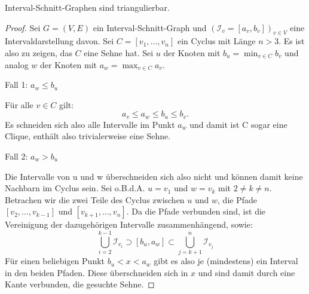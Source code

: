 \documentclass[../main.tex]{subfiles}
\begin{document}

\begin{satz}
    Interval-Schnitt-Graphen sind triangulierbar.
\end{satz}
\begin{proof}
    Sei $G = (V, E)$ ein Interval-Schnitt-Graph und $(\mathcal I_v = [a_v, b_v])_{v\in V}$ eine Intervaldarstellung davon. Sei $C = [v_1, \hdots, v_n]$ ein Cyclus mit Länge $n>3$. Es ist also zu zeigen, das $C$ eine Sehne hat. Sei $u$ der Knoten mit $b_u = \min_{v\in C} b_v$ und analog $w$ der Knoten mit $a_w = \max_{v\in C} a_v$.
    
    Fall 1: $a_w \leq b_u$
    
    Für alle $v\in C$ gilt: $$a_v\leq a_w \leq b_u \leq b_v.$$
    Es schneiden sich also alle Intervalle im Punkt $a_w$ und damit ist C sogar eine Clique, enthält also trivialerweise eine Sehne.
    
    Fall 2: $a_w > b_u$
    
    Die Intervalle von u und w überschneiden sich also nicht und können damit keine Nachbarn im Cyclus sein. Sei o.B.d.A. $u = v_1$ und $w=v_k$ mit $2 \neq k \neq n$. Betrachen wir die zwei Teile des Cyclus zwischen $u$ und $w$, die Pfade $[v_2, \hdots, v_{k-1}]$ und $[v_{k+1}, \hdots, v_n]$. Da die Pfade verbunden sind, ist die Vereinigung der dazugehörigen Intervalle zusammenhängend, sowie:
    \begin{equation*}
        \bigcup\limits_{i = 2}^{k-1} \mathcal I_{v_i} \supset [b_u, a_w] \subset \bigcup\limits_{j = k+1}^{n} \mathcal I_{v_j}
    \end{equation*}
    Für einen beliebigen Punkt $b_u < x < a_w$ gibt es also je (mindestens) ein Interval in den beiden Pfaden. Diese überschneiden sich in $x$ und sind damit durch eine Kante verbunden, die gesuchte Sehne.
\end{proof}
    
\end{document}
